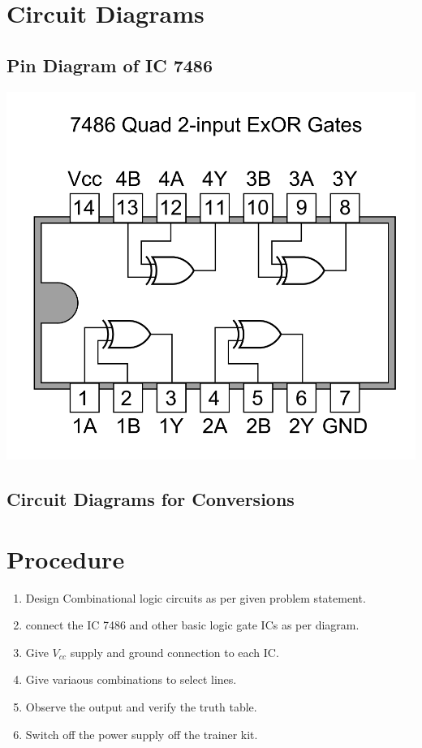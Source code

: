 \documentclass[11pt]{article}
\begin{document}
\section{Circuit Diagrams}
\subsection{Pin Diagram of IC 7486}
\centering
\includegraphics[scale = 0.3]{7486_Quad_2-input_ExOR_Gates.png}
\subsection{Circuit Diagrams for Conversions}



\section{Procedure}

\begin{enumerate}
	\item Design Combinational logic circuits as per given problem statement.
	\item connect the IC 7486 and other basic logic gate ICs as per diagram.
	\item Give $V_{cc}$ supply and ground connection to each IC.
	\item Give variaous combinations to select lines.
	\item Observe the output and verify the truth table.
	\item Switch off the power supply off the trainer kit.
\end{enumerate}
\end{document}
